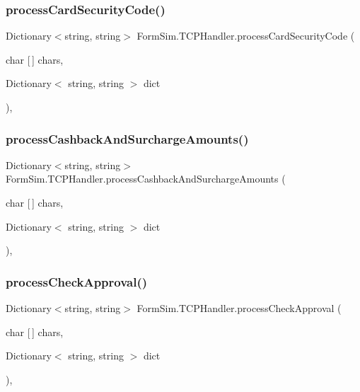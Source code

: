 \subsubsection{\texorpdfstring{process\+Card\+Security\+Code()}{processCardSecurityCode()}}
{\footnotesize\ttfamily Dictionary$<$string, string$>$ Form\+Sim.\+T\+C\+P\+Handler.\+process\+Card\+Security\+Code (\begin{DoxyParamCaption}\item[{char \mbox{[}$\,$\mbox{]}}]{chars,  }\item[{Dictionary$<$ string, string $>$}]{dict }\end{DoxyParamCaption})\hspace{0.3cm}{\ttfamily [inline]}, {\ttfamily [private]}}

\mbox{\label{class_form_sim_1_1_t_c_p_handler_a5e5d6e5d1e9995cd5f212bac4eb9168a}} 
\subsubsection{\texorpdfstring{process\+Cashback\+And\+Surcharge\+Amounts()}{processCashbackAndSurchargeAmounts()}}
{\footnotesize\ttfamily Dictionary$<$string, string$>$ Form\+Sim.\+T\+C\+P\+Handler.\+process\+Cashback\+And\+Surcharge\+Amounts (\begin{DoxyParamCaption}\item[{char \mbox{[}$\,$\mbox{]}}]{chars,  }\item[{Dictionary$<$ string, string $>$}]{dict }\end{DoxyParamCaption})\hspace{0.3cm}{\ttfamily [inline]}, {\ttfamily [private]}}

\mbox{\label{class_form_sim_1_1_t_c_p_handler_af873827846e56cca37deb08de148c725}} 
\subsubsection{\texorpdfstring{process\+Check\+Approval()}{processCheckApproval()}}
{\footnotesize\ttfamily Dictionary$<$string, string$>$ Form\+Sim.\+T\+C\+P\+Handler.\+process\+Check\+Approval (\begin{DoxyParamCaption}\item[{char \mbox{[}$\,$\mbox{]}}]{chars,  }\item[{Dictionary$<$ string, string $>$}]{dict }\end{DoxyParamCaption})\hspace{0.3cm}{\ttfamily [inline]}, {\ttfamily [private]}}

